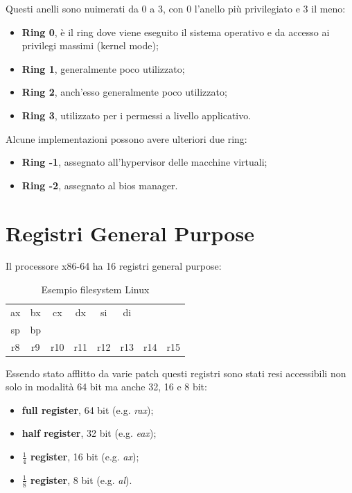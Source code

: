 Questi anelli sono nuimerati da 0 a 3, con 0 l'anello più privilegiato e 3 il meno:
\begin{itemize}
    \item \textbf{Ring 0}, è il ring dove viene eseguito il sistema operativo e da accesso ai privilegi massimi (kernel mode);
    \item \textbf{Ring 1}, generalmente poco utilizzato;
    \item \textbf{Ring 2}, anch'esso generalmente poco utilizzato;
    \item \textbf{Ring 3}, utilizzato per i permessi a livello applicativo.
\end{itemize}
Alcune implementazioni possono avere ulteriori due ring:
\begin{itemize}
    \item \textbf{Ring -1}, assegnato all'hypervisor delle macchine virtuali;
    \item \textbf{Ring -2}, assegnato al bios manager.
\end{itemize}

\section{Registri General Purpose}
Il processore x86-64 ha 16 registri general purpose:
\begin{center}
    \begin{table}[]
        \centering
        \begin{tabular}{|c|c|c|c|c|c|c|c|}
            ax & bx & cx & dx & si & di \\
            sp & bp \\
            r8 & r9 & r10 & r11 & r12 & r13 & r14 & r15
        \end{tabular}
        \caption{Esempio filesystem Linux}
    \end{table}
\end{center}
Essendo stato afflitto da varie patch questi registri sono stati resi accessibili non solo in modalità 64 bit ma anche 32, 16 e 8 bit:
\begin{itemize}
    \item \textbf{full register}, 64 bit (e.g. \textit{rax});
    \item \textbf{half register}, 32 bit (e.g. \textit{eax});
    \item \textbf{$\frac{1}{4}$ register}, 16 bit (e.g. \textit{ax});
    \item \textbf{$\frac{1}{8}$ register}, 8 bit (e.g. \textit{al}).
\end{itemize}

